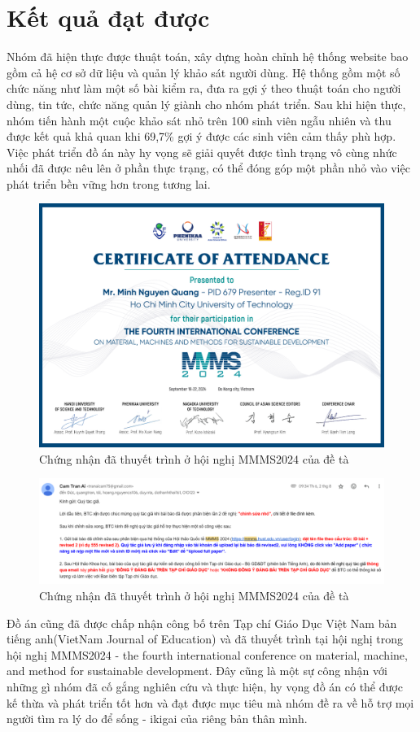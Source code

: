 \section{Kết quả đạt được}
    Nhóm đã hiện thực được thuật toán, xây dựng hoàn chỉnh hệ thống website bao gồm cả hệ cơ sở dữ liệu và quản lý khảo sát người dùng. Hệ thống gồm một số chức năng như làm một số bài kiểm ra, đưa ra gợi ý theo thuật toán cho người dùng, tin tức, chức năng quản lý giành cho nhóm phát triển. Sau khi hiện thực, nhóm tiến hành một cuộc khảo sát nhỏ trên 100 sinh viên ngẫu nhiên và thu được kết quả khả quan khi 69,7\% gợi ý được các sinh viên cảm thấy phù hợp. Việc phát triển đồ án này hy vọng sẽ giải quyết được tình trạng vô cùng nhức nhối đã được nêu lên ở phần thực trạng, có thể đóng góp một phần nhỏ vào việc phát triển bền vững hơn trong tương lai.
    
    \begin{figure}[H]
        \centering
        \includegraphics[width=0.8\linewidth, height=0.3\textheight]{images/present.png}
        \vspace{0.6cm}
        \caption{Chứng nhận đã thuyết trình ở hội nghị MMMS2024 của đề tà}
    \end{figure}

    \begin{figure}[H]
        \centering
        \includegraphics[width=0.8\linewidth, height=0.3\textheight]{images/email.png}
        \vspace{0.6cm}
        \caption{Chứng nhận đã thuyết trình ở hội nghị MMMS2024 của đề tà}
    \end{figure}
    

    Đồ án cũng đã được chấp nhận công bố trên Tạp chí Giáo Dục Việt Nam bản tiếng anh(VietNam Journal of Education) và đã thuyết trình tại hội nghị trong hội nghị MMMS2024 - the fourth international conference on material, machine, and method for sustainable development. Đây cũng là một sự công nhận với những gì nhóm đã cố gắng nghiên cứu và thực hiện, hy vọng đồ án có thể được kế thừa và phát triển tốt hơn và đạt được mục tiêu mà nhóm đề ra về hỗ trợ mọi người tìm ra lý do để sống - ikigai của riêng bản thân mình.